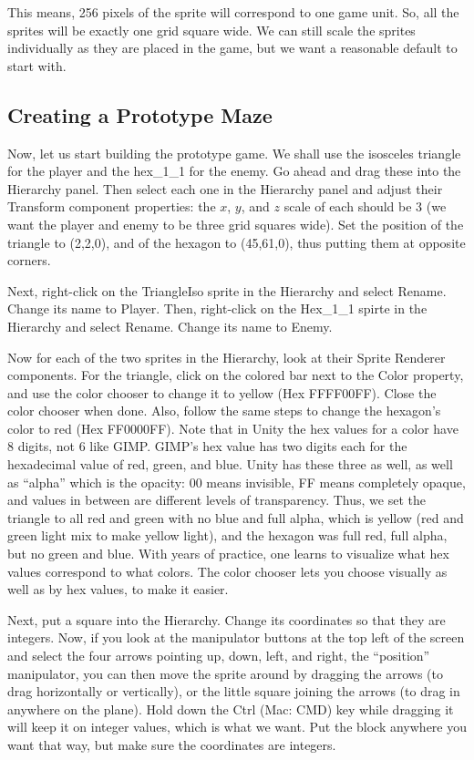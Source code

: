 \documentclass[12pt]{amsbook}
\theoremstyle{definition}
\theoremstyle{remark}
\numberwithin{figure}{chapter}
\numberwithin{table}{chapter}
\numberwithin{section}{chapter}
\numberwithin{equation}{section}
\begin{document}
This means, 256 pixels of the sprite will correspond to one game unit.  So, all the sprites will be exactly one grid square wide.  We can still scale the sprites individually as they are placed in the game, but we want a reasonable default to start with.

\subsection{Creating a Prototype Maze}

Now, let us start building the prototype game.  We shall use the isosceles triangle for the player and the hex\_1\_1 for the enemy.  Go ahead and drag these into the Hierarchy panel.  Then select each one in the Hierarchy panel and adjust their Transform component properties: the $x$, $y$, and $z$ scale of each should be 3 (we want the player and enemy to be three grid squares wide).  Set the position of the triangle to (2,2,0), and of the hexagon to (45,61,0), thus putting them at opposite corners.  

Next, right-click on the TriangleIso sprite in the Hierarchy and select Rename.  Change its name to Player.  Then, right-click on the Hex\_1\_1 spirte in the Hierarchy and select Rename.  Change its name to Enemy.

Now for each of the two sprites in the Hierarchy, look at their Sprite Renderer components.  For the triangle, click on the colored bar next to the Color property, and use the color chooser to change it to yellow (Hex FFFF00FF).  Close the color chooser when done.  Also, follow the same steps to change the hexagon's color to red (Hex FF0000FF).  Note that in Unity the hex values for a color have 8 digits, not 6 like GIMP.  GIMP's hex value has two digits each for the hexadecimal value of red, green, and blue.  Unity has these three as well, as well as ``alpha'' which is the opacity: 00 means invisible, FF means completely opaque, and values in between are different levels of transparency.  Thus, we set the triangle to all red and green with no blue and full alpha, which is yellow (red and green light mix to make yellow light), and the hexagon was full red, full alpha, but no green and blue.  With years of practice, one learns to visualize what hex values correspond to what colors.  The color chooser lets you choose visually as well as by hex values, to make it easier.

Next, put a square into the Hierarchy.  Change its coordinates so that they are integers.  Now, if you look at the manipulator buttons at the top left of the screen and select the four arrows pointing up, down, left, and right, the ``position'' manipulator, you can then move the sprite around by dragging the arrows (to drag horizontally or vertically), or the little square joining the arrows (to drag in anywhere on the plane).  Hold down the Ctrl (Mac: CMD) key while dragging it will keep it on integer values, which is what we want.  Put the block anywhere you want that way, but make sure the coordinates are integers.  
\end{document}
